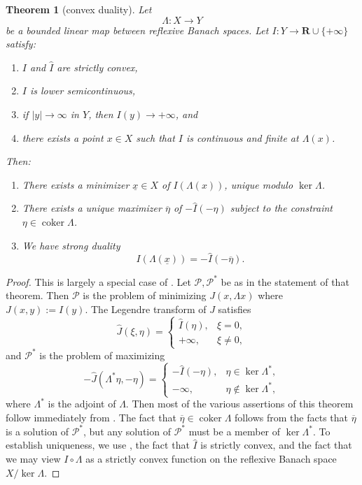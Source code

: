 \documentclass[reqno,11pt]{amsart}
\newcommand{\RR}{\mathbf{R}}
\DeclareMathOperator{\coker}{coker}
\newcommand{\dfn}[1]{\emph{#1}\index{#1}}
\newtheorem{theorem}{Theorem}[section]
\theoremstyle{definition}
\numberwithin{equation}{section}
\begin{document}
\begin{theorem}[convex duality]\label{abstract convex analysis}
Let 
$$\Lambda : X \to Y$$
be a bounded linear map between reflexive Banach spaces.
Let $I: Y \to \RR \cup \{+\infty\}$ satisfy:
\begin{enumerate}
\item $I$ and $\hat I$ are strictly convex,
\item $I$ is lower semicontinuous,
\item if $|y| \to \infty$ in $Y$, then $I(y) \to +\infty$, and 
\item there exists a point $x \in X$ such that $I$ is continuous and finite at $\Lambda(x)$.
\end{enumerate}
Then:
\begin{enumerate}
\item There exists a minimizer $\underline x \in X$ of $I(\Lambda(x))$, unique modulo $\ker \Lambda$.
\item There exists a unique maximizer $\overline \eta$ of $-\hat I(-\eta)$ subject to the constraint $\eta \in \coker \Lambda$.
\item We have \dfn{strong duality}
\begin{equation}\label{abstract strong duality}
I(\Lambda(\underline x)) = -\hat I(-\overline \eta).
\end{equation}
\end{enumerate}
\end{theorem}
\begin{proof}
This is largely a special case of \cite[Chapter IV, Theorem 4.2]{Ekeland99}.
Let $\mathscr P, \mathscr P^*$ be as in the statement of that theorem.
Then $\mathscr P$ is the problem of minimizing $J(x, \Lambda x)$ where $J(x, y) := I(y)$.
The Legendre transform of $J$ satisfies 
$$\hat J(\xi, \eta) = \begin{cases} \hat I(\eta), & \xi = 0, \\
	+\infty, &\xi \neq 0,
\end{cases}$$
and $\mathscr P^*$ is the problem of maximizing
$$-\hat J(\Lambda^* \eta, -\eta) = \begin{cases}
	-\hat I(-\eta), &\eta \in \ker \Lambda^*, \\
	-\infty, &\eta \notin \ker \Lambda^*,
\end{cases}$$
where $\Lambda^*$ is the adjoint of $\Lambda$.
Then most of the various assertions of this theorem follow immediately from \cite[Chapter IV, Theorem 4.2]{Ekeland99}.
The fact that $\overline \eta \in \coker \Lambda$ follows from the facts that $\overline \eta$ is a solution of $\mathscr P^*$, but any solution of $\mathscr P^*$ must be a member of $\ker \Lambda^*$. 
To establish uniqueness, we use \cite[Chapter II, Proposition 1.2]{Ekeland99}, the fact that $\hat I$ is strictly convex, and the fact that we may view $I \circ \Lambda$ as a strictly convex function on the reflexive Banach space $X/\ker \Lambda$.
\end{proof}
\end{document}
